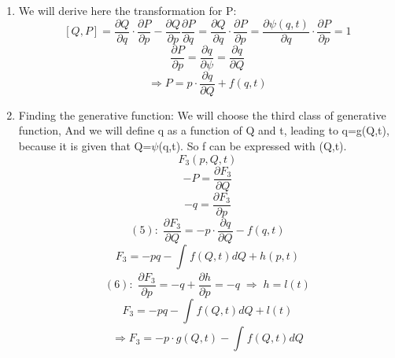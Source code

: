 \documentclass[11pt,fleqn]{article}
\newcommand{\Dn}{\vspace*{3mm}}
\begin{document}
\Dn
\begin{enumerate}
\item We will derive here the transformation for P:
\begin{equation}
\left[Q,P\right]=\frac{\partial Q}{\partial q}\cdot\frac{\partial P}{\partial p}-\frac{\partial Q}{\partial p}\frac{\partial P}{\partial q}=\frac{\partial Q}{\partial q}\cdot\frac{\partial P}{\partial p}=\frac{\partial \psi(q,t)}{\partial q}\cdot\frac{\partial P}{\partial p}=1
\end{equation}
\begin{equation}
\frac{\partial P}{\partial p}=\frac{\partial q}{\partial \psi}=\frac{\partial q}{\partial Q}
\end{equation}
\begin{equation}
\Rightarrow 
\boxed {P=p\cdot\frac{\partial q}{\partial Q}+f(q,t)}
\end{equation}
\item Finding the generative function:
\newline
We will choose the third class of generative function, And we will define q as a function of  Q and t, leading to q=g(Q,t), because it is given that Q=$\psi$(q,t). So f can be expressed with (Q,t).
\begin{equation}
F_{3}(p,Q,t)
\end{equation}
\begin{equation}
-P=\frac{\partial F_{3}}{\partial Q}
\end{equation}
\begin{equation}
-q=\frac{\partial F_{3}}{\partial p}
\end{equation}
\newline
\begin{equation}
(5): \;\frac{\partial F_{3}}{\partial Q}=-p\cdot\frac{\partial q}{\partial Q}-f(q,t)
\end{equation}
\begin{equation}
F_{3}=-pq-\int_{}^{} f(Q,t)dQ+h(p,t)
\end{equation}
\begin{equation}
(6):\;\frac{\partial F_{3}}{\partial p}=-q+\frac{\partial h}{\partial p}=-q \; \Rightarrow\; h=l(t)
\end{equation}
\begin{equation}
F_{3}=-pq-\int_{}^{} f(Q,t)dQ+l(t) 
\end{equation}
\begin{equation}
\Rightarrow \boxed{F_{3}=-p\cdot g(Q,t)-\int_{}^{} f(Q,t)dQ}
\end{equation}

\end{enumerate}
\end{document}
